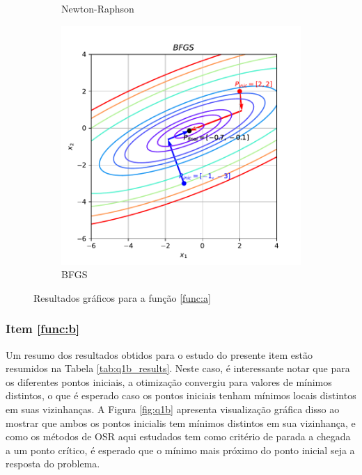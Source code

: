 \documentclass[10pt, a4paper]{article}
\begin{document}
\begin{figure}[htpb]
\begin{subfigure}[b]{0.32\textwidth}
    \caption{Newton-Raphson}
    \label{fig:q1a_newtnraph}
  \end{subfigure}
  \hfill
  \begin{subfigure}[b]{0.32\textwidth}
    \centering
    \includegraphics[width=\textwidth]{images/q1a_BFGS.pdf}
    \caption{BFGS}
    \label{fig:q1a_bfgs}
  \end{subfigure}
     \caption{Resultados gráficos para a função \ref{func:a}}
     \label{fig:q1a}
\end{figure}

\subsubsection{Item \ref{func:b}}

Um resumo dos resultados obtidos para o estudo do presente item estão resumidos na Tabela \ref{tab:q1b_results}.
Neste caso, é interessante notar que para os diferentes pontos iniciais, a otimização convergiu para valores de mínimos
distintos, o que é esperado caso os pontos iniciais tenham mínimos locais distintos em suas vizinhanças. 
A Figura \ref{fig:q1b} apresenta visualização gráfica disso ao mostrar que ambos os pontos inicialis tem mínimos distintos
em sua vizinhança, e como os métodos de OSR aqui estudados tem como critério de parada a chegada a um ponto crítico, é esperado
que o mínimo mais próximo do ponto inicial seja a resposta do problema.
\end{document}
